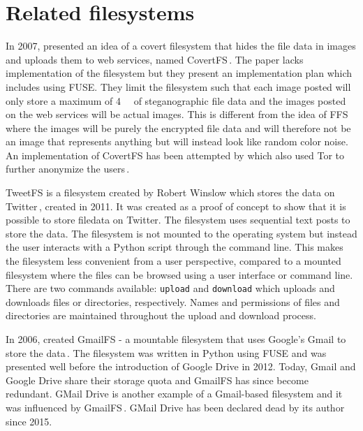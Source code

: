 \section{Related filesystems}

In 2007, \citeauthor{baliga2007web} presented an idea of a covert filesystem that hides the file data in images and uploads them to web services, named CovertFS\,\cite{baliga2007web}. The paper lacks implementation of the filesystem but they present an implementation plan which includes using FUSE. They limit the filesystem such that each image posted will only store a maximum of \SI{4}{\kilo\byte} of steganographic file data and the images posted on the web services will be actual images. This is different from the idea of FFS where the images will be purely the encrypted file data and will therefore not be an image that represents anything but will instead look like random color noise. An implementation of CovertFS has been attempted by \citeauthor{sosaSuperSecretFile2007} which also used Tor to further anonymize the users\,\cite{sosaSuperSecretFile2007}.

TweetFS is a filesystem created by Robert Winslow which stores the data on Twitter\,\cite{winslowTweetfsTweetfsMaster}, created in 2011. It was created as a proof of concept to show that it is possible to store filedata on Twitter. The filesystem uses sequential text posts to store the data. The filesystem is not mounted to the operating system but instead the user interacts with a Python script  through the command line. This makes the filesystem less convenient from a user perspective, compared to a mounted filesystem where the files can be browsed using a user interface or command line. There are two commands available: \texttt{upload} and \texttt{download} which uploads and downloads files or directories, respectively. Names and permissions of files and directories are maintained throughout the upload and download process.

In 2006, \citeauthor{jonesGoogleHackUse2006} created GmailFS - a mountable filesystem that uses Google's Gmail to store the data\,\cite{jonesGoogleHackUse2006, jonesGmailFilesystemImplementation2006}. The filesystem was written in Python using FUSE and was presented well before the introduction of Google Drive in 2012. Today, Gmail and Google Drive share their storage quota and GmailFS has since become redundant. GMail Drive is another example of a Gmail-based filesystem and it was influenced by GmailFS\,\cite{viksoeViksoeDkGMail2004}. GMail Drive has been declared dead by its author since 2015.

